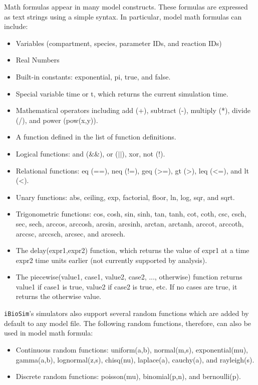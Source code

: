 \documentclass[titlepage,11pt]{article}
\begin{document}
\noindent
Math formulas appear in many model constructs.  These formulas are expressed as text strings using a simple syntax.  In particular, model math formulas can include: 
\begin{itemize}
\item Variables (compartment, species, parameter IDs, and reaction IDs)
\item Real Numbers
\item Built-in constants: exponential, pi, true, and false.
\item Special variable time or t, which returns the current simulation time.
\item Mathematical operators including add (+), subtract (-), multiply (*), divide (/), and power (pow(x,y)).
\item A function defined in the list of function definitions.
\item Logical functions: and (\&\&), or ($||$), xor, not (!).
\item Relational functions: eq (==), neq (!=), geq (>=), gt (>), leq (<=), and lt (<).
\item Unary functions: abs, ceiling, exp, factorial, floor, ln, log, sqr, and sqrt.
\item Trigonometric functions: cos, cosh, sin, sinh, tan, tanh, cot, coth, csc, csch, sec, sech, arccos, arccosh, arcsin, arcsinh, arctan, arctanh, arccot, arccoth, arccsc, arccsch, arcsec, and arcsech.
\item The delay(expr1,expr2) function, which returns the value of expr1 at a time expr2 time units earlier (not currently supported by analysis).
\item The piecewise(value1, case1, value2, case2, ..., otherwise) function returns value1 if case1 is true, value2 if case2 is true, etc.  If no cases are true, it returns the otherwise value.
\end{itemize}

{\tt iBioSim}'s simulators also support several random functions which are added by default to any model file.  The following random functions, therefore, can also be used in model math formula:
\begin{itemize}
\item Continuous random functions: uniform(a,b), normal(m,s), exponential(mu), gamma(a,b), lognormal(z,s), chisq(nu), laplace(a), cauchy(a), and rayleigh(s).
\item Discrete random functions: poisson(mu), binomial(p,n), and bernoulli(p).
\end{itemize}
\end{document}
